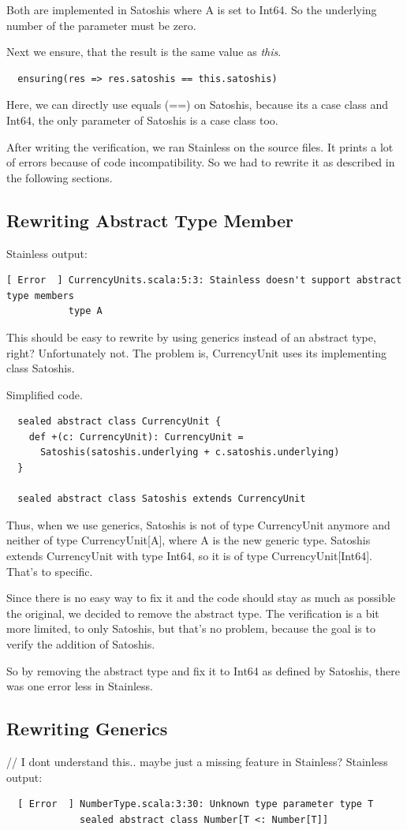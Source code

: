 Both are implemented in Satoshis where A is set to Int64.
So the underlying number of the parameter must be zero.

Next we ensure, that the result is the same value as \emph{this}.
\begin{lstlisting}
  ensuring(res => res.satoshis == this.satoshis)
\end{lstlisting}
Here, we can directly use equals (==) on Satoshis, because its a case class and Int64, the only parameter of Satoshis is a case class too.

After writing the verification, we ran Stainless on the source files.
It prints a lot of errors because of code incompatibility.
So we had to rewrite it as described in the following sections.

\subsection{Rewriting Abstract Type Member}
Stainless output:
\begin{lstlisting}
[ Error  ] CurrencyUnits.scala:5:3: Stainless doesn't support abstract type members
           type A
\end{lstlisting}
This should be easy to rewrite by using generics instead of an abstract type, right?
Unfortunately not.
The problem is, CurrencyUnit uses its implementing class Satoshis.

Simplified code.
\begin{lstlisting}
  sealed abstract class CurrencyUnit {
    def +(c: CurrencyUnit): CurrencyUnit =
      Satoshis(satoshis.underlying + c.satoshis.underlying)
  }

  sealed abstract class Satoshis extends CurrencyUnit
\end{lstlisting}
Thus, when we use generics, Satoshis is not of type CurrencyUnit anymore and neither of type CurrencyUnit[A], where A is the new generic type.
Satoshis extends CurrencyUnit with type Int64, so it is of type CurrencyUnit[Int64].
That's to specific.

Since there is no easy way to fix it and the code should stay as much as possible the original, we decided to remove the abstract type.
The verification is a bit more limited, to only Satoshis, but that's no problem, because the goal is to verify the addition of Satoshis.

So by removing the abstract type and fix it to Int64 as defined by Satoshis, there was one error less in Stainless.

\subsection{Rewriting Generics}
// I dont understand this.. maybe just a missing feature in Stainless?
Stainless output:
\begin{lstlisting}
  [ Error  ] NumberType.scala:3:30: Unknown type parameter type T
             sealed abstract class Number[T <: Number[T]]

\end{lstlisting}

